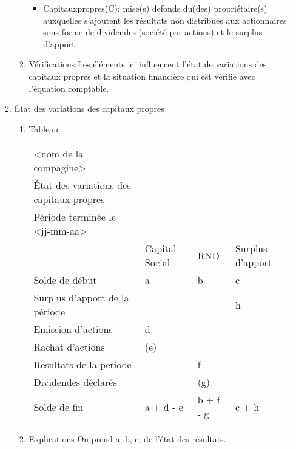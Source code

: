 \documentclass[11pt]{article}
\begin{document}
\begin{enumerate}
\begin{enumerate}
\begin{enumerate}
\begin{itemize}
\item Capitauxpropres(C): mise(s) defonds du(des) propriétaire(s) auxquelles
s’ajoutent les résultats non distribués aux actionnaires sous forme de
dividendes (société par actions) et le surplus d’apport.
\end{itemize}
\item Vérifications
\label{sec:orgb4b94bb}
Les éléments ici influencent l'état de variations des capitaux propres et la
situation financière qui est vérifié avec l'équation comptable.
\end{enumerate}
\item État des variations des capitaux propres
\label{sec:org1ffe1a0}
\begin{enumerate}
\item Tableau
\label{sec:org8d353e2}
\begin{center}
\begin{tabular}{llll}
<nom de la compagine> &  &  & \\
État des variations des capitaux propres &  &  & \\
Période terminée le <jj-mm-aa> &  &  & \\
\hline
 & Capital Social & RND & Surplus d'apport\\
\hline
Solde de début & a & b & c\\
\hline
Surplus d'apport de la période &  &  & h\\
Emission d'actions & d &  & \\
Rachat d'actions & (e) &  & \\
Resultats de la periode &  & f & \\
Dividendes déclarés &  & (g) & \\
\hline
Solde de fin & a + d - e & b + f - g & c + h\\
\hline
\end{tabular}
\end{center}

\item Explications
\label{sec:orga957554}
On prend a, b, c, de l'état des résultats.


\end{enumerate}
\end{enumerate}
\end{enumerate}
\end{document}
